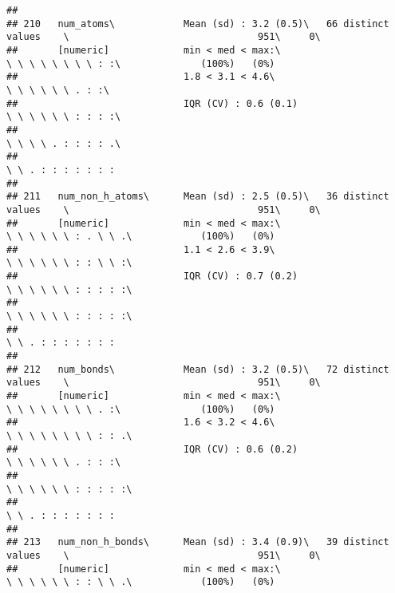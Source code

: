 \documentclass[]{article}
\begin{document}
\begin{verbatim}
## 
## 210   num_atoms\            Mean (sd) : 3.2 (0.5)\   66 distinct values    \                                 951\     0\       
##       [numeric]             min < med < max:\                              \ \ \ \ \ \ \ \ : :\              (100%)   (0%)     
##                             1.8 < 3.1 < 4.6\                               \ \ \ \ \ \ . : :\                                  
##                             IQR (CV) : 0.6 (0.1)                           \ \ \ \ \ \ : : : :\                                
##                                                                            \ \ \ \ . : : : : .\                                
##                                                                            \ \ . : : : : : : :                                 
## 
## 211   num_non_h_atoms\      Mean (sd) : 2.5 (0.5)\   36 distinct values    \                                 951\     0\       
##       [numeric]             min < med < max:\                              \ \ \ \ \ \ : . \ \ .\            (100%)   (0%)     
##                             1.1 < 2.6 < 3.9\                               \ \ \ \ \ \ : : \ \ :\                              
##                             IQR (CV) : 0.7 (0.2)                           \ \ \ \ \ \ : : : : :\                              
##                                                                            \ \ \ \ \ \ : : : : :\                              
##                                                                            \ \ . : : : : : : :                                 
## 
## 212   num_bonds\            Mean (sd) : 3.2 (0.5)\   72 distinct values    \                                 951\     0\       
##       [numeric]             min < med < max:\                              \ \ \ \ \ \ \ \ . :\              (100%)   (0%)     
##                             1.6 < 3.2 < 4.6\                               \ \ \ \ \ \ \ \ : : .\                              
##                             IQR (CV) : 0.6 (0.2)                           \ \ \ \ \ \ . : : :\                                
##                                                                            \ \ \ \ \ \ : : : : :\                              
##                                                                            \ \ . : : : : : : :                                 
## 
## 213   num_non_h_bonds\      Mean (sd) : 3.4 (0.9)\   39 distinct values    \                                 951\     0\       
##       [numeric]             min < med < max:\                              \ \ \ \ \ \ : : \ \ .\            (100%)   (0%)     

\end{verbatim}
\end{document}
